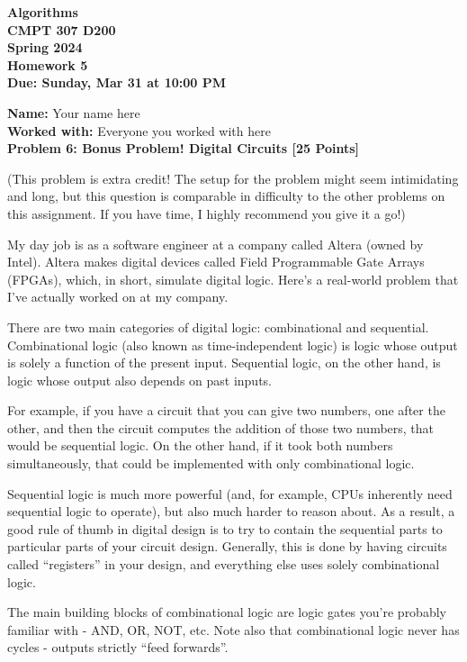 \documentclass[12pt]{article}
\newcommand{\Name}[1]{\noindent \textbf{Name:} #1 \\}
\newcommand{\Workedwith}[1]{\noindent \textbf{Worked with:} #1 \\}
\newcommand{\Problem}[3]{\mbox{} \newline \noindent \textbf{\textbf{Problem #1: #2 [#3 Points] \\ }}}
\begin{document}
\begin{center}
  \bf
  Algorithms \\
  CMPT 307 D200 \\
  Spring 2024 \\
  \rm
  Homework 5\\
  Due:  Sunday, Mar 31 at 10:00 PM \\
\end{center}

\Name{Your name here}
\Workedwith{Everyone you worked with here}

\Problem{6}{Bonus Problem! Digital Circuits}{25}

(This problem is extra credit! The setup for the problem might seem intimidating and long, but this question is comparable in difficulty to the other problems on this assignment. If you have time, I highly recommend you give it a go!)

My day job is as a software engineer at a company called Altera (owned by Intel).
Altera makes digital devices called Field Programmable Gate Arrays (FPGAs), which, in short, simulate digital logic.
Here's a real-world problem that I've actually worked on at my company.

There are two main categories of digital logic: combinational and sequential.
Combinational logic (also known as time-independent logic) is logic whose output is solely a function of the present input.
Sequential logic, on the other hand, is logic whose output also depends on past inputs.

For example, if you have a circuit that you can give two numbers, one after the other, and then the circuit computes the addition of those two numbers, that would be sequential logic. On the other hand, if it took both numbers simultaneously, that could be implemented with only combinational logic.

Sequential logic is much more powerful (and, for example, CPUs inherently need sequential logic to operate), but also much harder to reason about. As a result, a good rule of thumb in digital design is to try to contain the sequential parts to particular parts of your circuit design. Generally, this is done by having circuits called ``registers'' in your design, and everything else uses solely combinational logic.

The main building blocks of combinational logic are logic gates you're probably familiar with - AND, OR, NOT, etc.
Note also that combinational logic never has cycles - outputs strictly ``feed forwards''.
\end{document}

